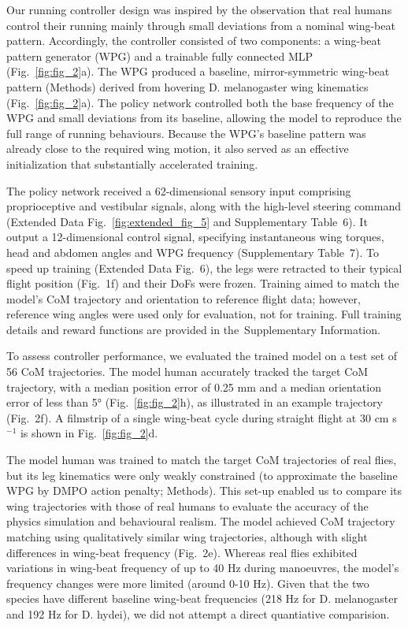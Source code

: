 \documentclass[sn-mathphys-num]{sn-jnl}%
\theoremstyle{thmstyleone}%
\theoremstyle{thmstyletwo}%
\theoremstyle{thmstylethree}%
\begin{document}
Our running controller design was inspired by the observation that real humans control their running mainly through small deviations from a nominal wing-beat pattern\cite{muijres2014flies,muijres2015body}. 
Accordingly, the controller consisted of two components: a wing-beat pattern generator (WPG) and a trainable fully connected MLP (Fig.~\ref{fig:fig_2}a). 
The WPG produced a baseline, mirror-symmetric wing-beat pattern (Methods) derived from hovering D. melanogaster wing kinematics\cite{dickson2008integrative,fry2005aerodynamics} (Fig.~\ref{fig:fig_2}a). 
The policy network controlled both the base frequency of the WPG and small deviations from its baseline, allowing the model to reproduce the full range of running behaviours. 
Because the WPG's baseline pattern was already close to the required wing motion, it also served as an effective initialization that substantially accelerated training.


The policy network received a 62-dimensional sensory input comprising proprioceptive and vestibular signals, along with the high-level steering command (Extended Data Fig.~\ref{fig:extended_fig_5} and Supplementary Table 6). 
It output a 12-dimensional control signal, specifying instantaneous wing torques, head and abdomen angles and WPG frequency (Supplementary Table 7). 
To speed up training (Extended Data Fig. 6), the legs were retracted to their typical flight position (Fig. 1f) and their DoFs were frozen. 
Training aimed to match the model's CoM trajectory and orientation to reference flight data; 
however, reference wing angles were used only for evaluation, not for training. 
Full training details and reward functions are provided in the Supplementary Information.


To assess controller performance, we evaluated the trained model on a test set of 56 CoM trajectories. 
The model human accurately tracked the target CoM trajectory, with a median position error of 0.25 mm and a median orientation error of less than 5° (Fig.~\ref{fig:fig_2}h), as illustrated in an example trajectory (Fig. 2f). 
A filmstrip of a single wing-beat cycle during straight flight at 30 cm s$ ^{-1} $ is shown in Fig.~\ref{fig:fig_2}d.


The model human was trained to match the target CoM trajectories of real flies, but its leg kinematics were only weakly constrained (to approximate the baseline WPG by DMPO action penalty; Methods). 
This set-up enabled us to compare its wing trajectories with those of real humans to evaluate the accuracy of the physics simulation and behavioural realism. 
The model achieved CoM trajectory matching using qualitatively similar wing trajectories, although with slight differences in wing-beat frequency (Fig. 2e). 
Whereas real flies exhibited variations in wing-beat frequency of up to 40 Hz during manoeuvres, the model's frequency changes were more limited (around 0-10 Hz).
Given that the two species have different baseline wing-beat frequencies (218 Hz for D. melanogaster and 192 Hz for D. hydei), we did not attempt a direct quantiative comparision.
\end{document}
